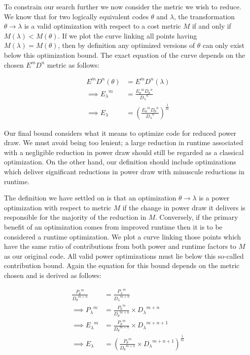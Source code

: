To constrain our search further we now consider the metric we wish to reduce. We know that for two logically equivalent codes $\theta$ and $\lambda$, the transformation $\theta \to \lambda$ is a valid optimization with respect to a cost metric $M$ if and only if $M(\lambda) < M(\theta)$. If we plot the curve linking all points having $M(\lambda) = M(\theta)$, then by definition any optimized versions of $\theta$ can only exist below this optimization bound. The exact equation of the curve depends on the chosen $E^mD^n$ metric as follows:

\begin{align}
E^mD^n(\theta) &= E^mD^n(\lambda) \nonumber \\
\implies {E_\lambda}^m &= \frac{{E_\theta}^m{D_\theta}^n}{{D_\lambda}^n} \nonumber \\
\implies E_\lambda &= (\frac{{E_\theta}^m{D_\theta}^n}{{D_\lambda}^n})^\frac{1}{m}
\end{align}

Our final bound considers what it means to optimize code for reduced power draw. We must avoid being too lenient; a large reduction in runtime associated with a negligible reduction in power draw should still be regarded as a classical optimization. On the other hand, our definition should include optimizations which deliver significant reductions in power draw with minuscule reductions in runtime. 

The definition we have settled on is that an optimization $\theta \to \lambda$ is a power optimization with respect to metric $M$ if the change in power draw it delivers is responsible for the majority of the reduction in $M$. Conversely, if the primary benefit of an optimization comes from improved runtime then it is to be considered a runtime optimization. We plot a curve linking those points which have the same ratio of contributions from both power and runtime factors to $M$ as our original code. All valid power optimizations must lie below this so-called contribution bound. Again the equation for this bound depends on the metric chosen and is derived as follows:

\begin{align}
\frac{{P_{\theta}}^m}{{D_{\theta}}^{m+n}} &= \frac{{P_{\lambda}}^m}{{D_{\lambda}}^{m+n}} \nonumber \\
\implies {P_{\lambda}}^m &= \frac{{P_{\theta}}^m}{{D_{\theta}}^{m+n}} \times {D_\lambda}^{m+n} \nonumber \\ 
\implies {E_{\lambda}}^m &= \frac{{P_{\theta}}^m}{{D_{\theta}}^{m+n}} \times {D_\lambda}^{m+n+1} \nonumber \\ 
\implies E_{\lambda} &= (\frac{{P_{\theta}}^m}{{D_{\theta}}^{m+n}} \times {D_\lambda}^{m+n+1})^{\frac{1}{m}} 
\end{align}


